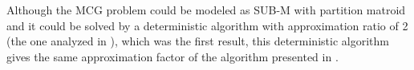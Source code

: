 
Although the MCG problem could be modeled as SUB-M with partition matroid and it could be solved by a deterministic algorithm with approximation ratio 
of 2 (the one analyzed in \cite{Nemhauser1978,Fisher1978}), which was the first result, this deterministic algorithm gives the same approximation factor 
of the algorithm presented in \cite{Chekuri2004}.



